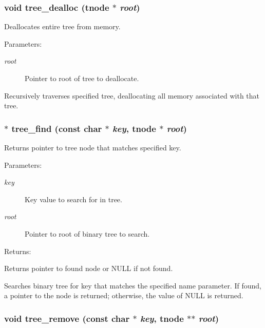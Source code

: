 \subsubsection{\setlength{\rightskip}{0pt plus 5cm}void tree\_\-dealloc ({\bf tnode} $\ast$ {\em root})}\label{tree_8c_a3}


Deallocates entire tree from memory.

\begin{Desc}
\item[Parameters: ]\par
\begin{description}
\item[{\em 
root}]Pointer to root of tree to deallocate.\end{description}
\end{Desc}
Recursively traverses specified tree, deallocating all memory associated with that tree. 
\subsubsection{$\ast$ tree\_\-find (const char $\ast$ {\em key}, {\bf tnode} $\ast$ {\em root})}\label{tree_8c_a1}


Returns pointer to tree node that matches specified key.

\begin{Desc}
\item[Parameters: ]\par
\begin{description}
\item[{\em 
key}]Key value to search for in tree. \item[{\em 
root}]Pointer to root of binary tree to search.\end{description}
\end{Desc}
\begin{Desc}
\item[Returns: ]\par
Returns pointer to found node or NULL if not found.\end{Desc}
Searches binary tree for key that matches the specified name parameter. If found, a pointer to the node is returned; otherwise, the value of NULL is returned. 
\subsubsection{\setlength{\rightskip}{0pt plus 5cm}void tree\_\-remove (const char $\ast$ {\em key}, {\bf tnode} $\ast$$\ast$ {\em root})}\label{tree_8c_a2}


